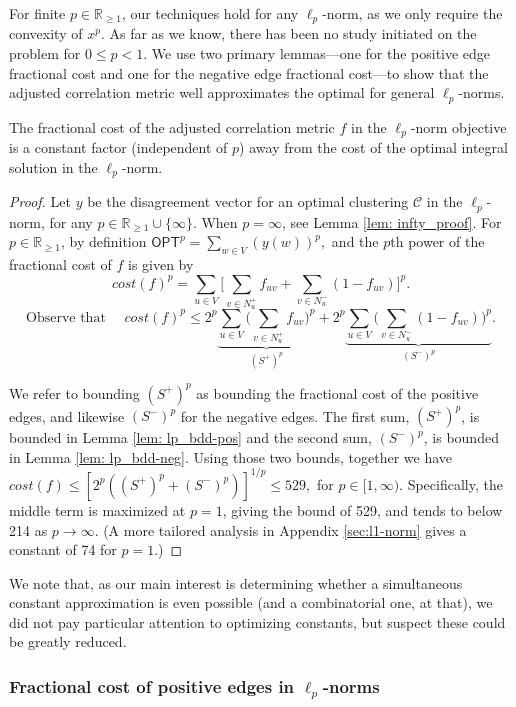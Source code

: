For finite $p \in \mathbb{R}_{\geq 1}$, our techniques hold for any $\ell_p$-norm, as we only require the convexity of $x^p$. As far as we know, there has been no study initiated on the problem for $0 \leq p<1$.
We use two primary lemmas---one for the positive edge fractional cost and one for the negative edge fractional cost---to show that the adjusted correlation metric well approximates the optimal for general $\ell_p$-norms.




\begin{lemma}\label{lem:lp-bdd}
    The fractional cost of the adjusted correlation metric $f$ in the $\ell_p$-norm objective is a constant factor (independent of $p$) away from the cost of the optimal integral solution in the $\ell_p$-norm.
\end{lemma}
\begin{proof}
Let $y$ be the disagreement vector for an optimal clustering $\mathcal{C}$ in the $\ell_p$-norm, for any $p \in \mathbb{R}_{\geq 1} \cup \{\infty\}$. 
When $p = \infty$, see Lemma \ref{lem: infty_proof}.
For $p\in \mathbb{R}_{\geq 1}$,
by definition $\textsf{OPT}^p = \sum_{w \in V} (y(w))^p,$
and the $p$th power of the fractional cost of $f$ is given by 
\[cost(f)^p = \sum_{u \in V} \Big[ \sum_{v \in N_u^+} f_{uv} + \sum_{v \in N_u^-} (1-f_{uv})\Big]^p.\]
\[\text{Observe that }\quad cost(f)^p \leq 2^p \underbrace{\sum_{u \in V} \Big(\sum_{v \in N_u^+} f_{uv} \Big)^p}_{(S^+)^p} + 2^p \underbrace{\sum_{u \in V} \Big(\sum_{v \in N_u^-} (1-f_{uv}) \Big)^p}_{(S^-)^p}.\]

We refer to bounding $(S^+)^p$ as bounding the fractional cost of the positive edges, and likewise $(S^-)^p$ for the negative edges. 
The first sum, $(S^+)^p$, is bounded in Lemma \ref{lem: lp_bdd-pos} and the second sum, $(S^-)^p$, is bounded in Lemma \ref{lem: lp_bdd-neg}. Using those two bounds, together we have 
$cost(f) \leq [2^p((S^+)^p + (S^-)^p)]^{1/p} \leq 529,$
for $p \in [1, \infty)$. Specifically, the middle term is maximized at $p=1$, giving the bound of 529, and tends to below 214 as $p \rightarrow \infty$. (A more tailored analysis in Appendix \ref{sec:l1-norm} gives a constant of 74 for $p=1$.)
\end{proof}
We note that, as our main interest is determining whether a simultaneous constant approximation is even possible (and a combinatorial one, at that), we did not pay particular attention to optimizing constants, but suspect these could be greatly reduced.

\subsubsection{Fractional cost of positive edges in $\ell_p$-norms} \label{sec: pos_edges_lp}

